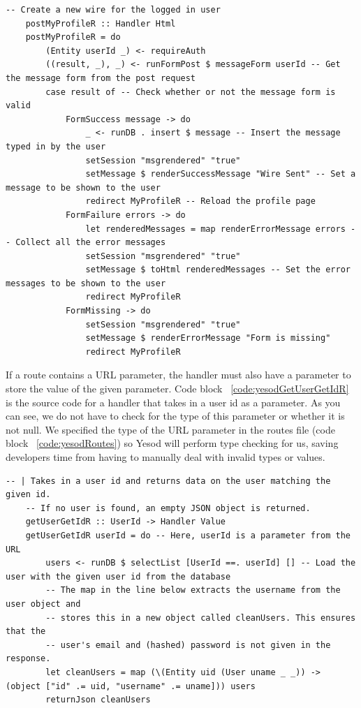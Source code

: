 \begin{lstlisting}[caption={POST request handler for current profile page},label={code:yesodPostProfileR}]
	-- Create a new wire for the logged in user
	postMyProfileR :: Handler Html
	postMyProfileR = do
		(Entity userId _) <- requireAuth
		((result, _), _) <- runFormPost $ messageForm userId -- Get the message form from the post request
		case result of -- Check whether or not the message form is valid
			FormSuccess message -> do
				_ <- runDB . insert $ message -- Insert the message typed in by the user
				setSession "msgrendered" "true"
				setMessage $ renderSuccessMessage "Wire Sent" -- Set a message to be shown to the user
				redirect MyProfileR -- Reload the profile page
			FormFailure errors -> do
				let renderedMessages = map renderErrorMessage errors -- Collect all the error messages
				setSession "msgrendered" "true"
				setMessage $ toHtml renderedMessages -- Set the error messages to be shown to the user
				redirect MyProfileR
			FormMissing -> do
				setSession "msgrendered" "true"
				setMessage $ renderErrorMessage "Form is missing"
				redirect MyProfileR
\end{lstlisting}

If a route contains a URL parameter, the handler must also have a parameter to store
the value of the given parameter. Code block ~\ref{code:yesodGetUserGetIdR} is the
source code for a handler that takes in a user id as a parameter. As you can see,
we do not have to check for the type of this parameter or whether it is not null.
We specified the type of the URL parameter in the routes file (code block ~\ref{code:yesodRoutes})
so Yesod will perform type checking for us, saving developers time from having
to manually deal with invalid types or values.

\begin{lstlisting}[caption={GET request handler for getting user data},label={code:yesodGetUserGetIdR}]
	-- | Takes in a user id and returns data on the user matching the given id.
	-- If no user is found, an empty JSON object is returned.
	getUserGetIdR :: UserId -> Handler Value
	getUserGetIdR userId = do -- Here, userId is a parameter from the URL
		users <- runDB $ selectList [UserId ==. userId] [] -- Load the user with the given user id from the database
		-- The map in the line below extracts the username from the user object and
		-- stores this in a new object called cleanUsers. This ensures that the
		-- user's email and (hashed) password is not given in the response. 
		let cleanUsers = map (\(Entity uid (User uname _ _)) -> (object ["id" .= uid, "username" .= uname])) users
		returnJson cleanUsers
\end{lstlisting}

